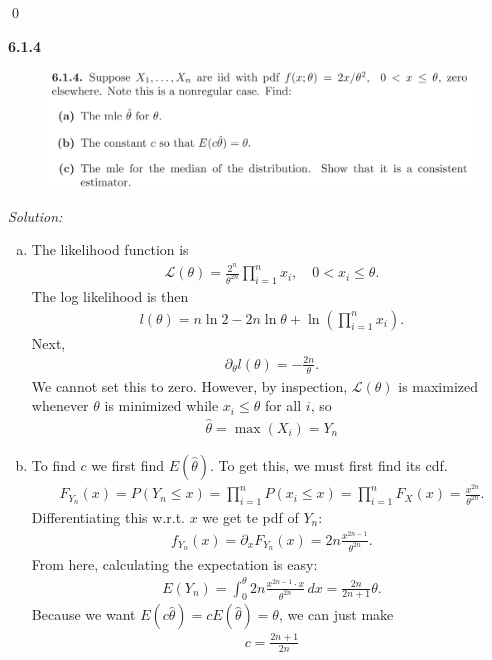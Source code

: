 \documentclass{book}
\theoremstyle{definition}
\newcommand{\p}{\partial}
\newcommand{\lag}{\mathcal{L}}
\newcommand{\f}[2]{\frac{#1}{#2}}
\newcommand{\lp}{\left(}
\newcommand{\rp}{\right)}
\begin{document}
\qed






\newpage
\noindent \textbf{6.1.4}
\begin{figure}[!htb]
	\centering
	\includegraphics[scale=0.25]{614}
\end{figure}

\noindent \textit{Solution:}

\begin{enumerate}[(a)]
	\item  The likelihood function is 
	\begin{align}
	\lag(\theta) = \f{2^n}{\theta^{2n}}\prod_{i=1}^n x_i, \quad 0 < x_i \leq \theta.
	\end{align}
	The log likelihood is then 
	\begin{align}
	l(\theta) = n\ln 2 - 2n \ln \theta + \ln \lp \prod^n_{i=1} x_i \rp.
	\end{align}
	Next,
	\begin{align}
	\p_\theta l(\theta) = -\f{2n}{\theta}. 
	\end{align}
	We cannot set this to zero. However, by inspection, $\lag(\theta)$ is maximized whenever $\theta$ is minimized while $x_i \leq \theta$ for all $i$, so 
	\begin{align}
	\boxed{\hat\theta = \max(X_i) = Y_n}
	\end{align}
	
	
	\item To find $c$ we first find $E(\hat\theta)$. To get this, we must first find its cdf. 
	\begin{align}
	F_{Y_n}(x) = P(Y_n \leq x) = \prod^n_{i=1}P(x_i \leq x) = \prod^n_{i=1}F_X(x) = \f{x^{2n}}{\theta^{2n}}.
	\end{align}
	Differentiating this w.r.t. $x$ we get te pdf of $Y_n$:
	\begin{align}
	f_{Y_n}(x) = \p_x F_{Y_n}(x) = 2n \f{x^{2n - 1}}{\theta^{2n}}.
	\end{align}
	From here, calculating the expectation is easy:
	\begin{align}
	E(Y_n) = \int^\theta_0 2n \f{x^{2n-1}\cdot x}{\theta^{2n}}\,dx = \f{2n}{2n+1}\theta.  
	\end{align}
	Because we want $E(c\hat\theta) =cE(\hat\theta) = \theta$, we can just make 
	\begin{align}
	\boxed{c = \f{2n+1}{2n}}
	\end{align}
	

\end{enumerate}
\end{document}
